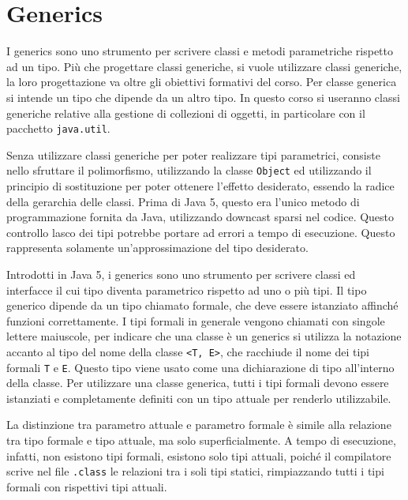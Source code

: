 \documentclass{article}
\numberwithin{equation}{subsection}
\begin{document}
\clearpage

\section{Generics}

I generics sono uno strumento per scrivere classi e metodi parametriche rispetto ad un tipo. Più che progettare classi generiche, si vuole utilizzare classi generiche, la loro 
progettazione va oltre gli obiettivi formativi del corso. Per classe generica si intende un tipo che dipende da un altro tipo. In questo corso si useranno classi generiche relative 
alla gestione di collezioni di oggetti, in particolare con il pacchetto \verb|java.util|. 

Senza utilizzare classi generiche per poter realizzare tipi parametrici, consiste nello sfruttare il polimorfismo, utilizzando la classe \verb|Object| ed utilizzando il 
principio di sostituzione per poter ottenere l'effetto desiderato, essendo la radice della gerarchia delle classi. Prima di Java 5, questo era l'unico metodo di programmazione 
fornita da Java, utilizzando downcast sparsi nel codice. Questo controllo lasco dei tipi potrebbe portare ad errori a tempo di esecuzione. 
Questo rappresenta solamente un'approssimazione del tipo desiderato. 


Introdotti in Java 5, i generics sono uno strumento per scrivere classi ed interfacce il cui tipo diventa parametrico rispetto ad uno o più tipi. Il tipo generico dipende 
da un tipo chiamato formale, che deve essere istanziato affinché funzioni correttamente. I tipi formali in generale vengono chiamati con singole lettere maiuscole, 
per indicare che una classe è un generics si utilizza la notazione accanto al tipo del nome della classe \verb|<T, E>|, che racchiude il nome dei tipi formali \verb|T| e \verb|E|. 
Questo tipo viene usato come una dichiarazione di tipo all'interno della classe. Per utilizzare una classe generica, tutti i tipi formali 
devono essere istanziati e completamente definiti con un tipo attuale per renderlo utilizzabile. 

La distinzione tra parametro attuale e parametro formale è simile alla relazione tra tipo formale e tipo attuale, ma solo superficialmente. A tempo di esecuzione, infatti, non esistono 
tipi formali, esistono solo tipi attuali, poiché il compilatore scrive nel file \verb|.class| le relazioni tra i soli tipi statici, rimpiazzando tutti i tipi formali con 
rispettivi tipi attuali. 
\end{document}
